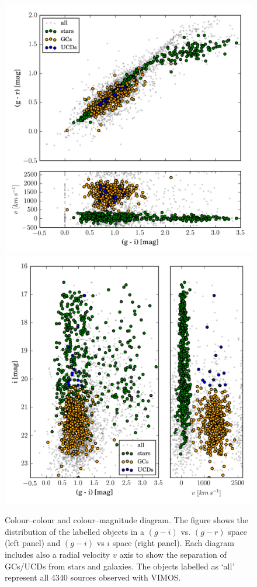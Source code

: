 \documentclass[usenatbib]{mnras}
\begin{document}
\begin{figure}
\centering
\includegraphics[width=\columnwidth]{figures/cc.png} 
\includegraphics[width=\columnwidth]{figures/cm.png} 
\caption{Colour--colour and colour--magnitude diagram. 
The figure shows the 
distribution of the labelled objects in a $(g-i)$ vs. $(g-r)$ space (left 
panel) and $(g-i)$ vs $i$ space (right panel). Each diagram includes also a 
radial velocity $v$ axis to show the separation of GCs/UCDs from stars and 
galaxies. The objects labelled as `all' represent all 4340 sources observed with VIMOS.
}
\label{fig:cc}
\end{figure}
\end{document}
